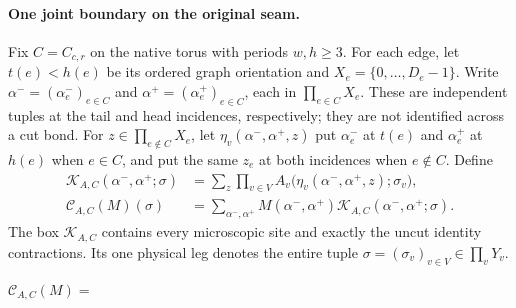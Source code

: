 \paragraph{One joint boundary on the original seam.}
Fix $C=C_{c,r}$ on the native torus with periods $w,h\geq3$.
For each edge, let $t(e)<h(e)$ be its ordered graph orientation and
$X_e=\{0,\ldots,D_e-1\}$. Write
$\alpha^-=(\alpha^-_e)_{e\in C}$ and
$\alpha^+=(\alpha^+_e)_{e\in C}$, each in $\prod_{e\in C}X_e$.
These are independent tuples at the tail and head incidences, respectively;
they are not identified across a cut bond.
For $z\in\prod_{e\notin C}X_e$, let
$\eta_v(\alpha^-,\alpha^+,z)$ put $\alpha^-_e$ at $t(e)$ and
$\alpha^+_e$ at $h(e)$ when $e\in C$, and put the same $z_e$ at
both incidences when $e\notin C$. Define
\begin{align}
    \mathcal K_{A,C}(\alpha^-,\alpha^+;\sigma)
     & =\sum_z\prod_{v\in V}
    A_v\bigl(\eta_v(\alpha^-,\alpha^+,z);\sigma_v\bigr), \\
    \mathcal C_{A,C}(M)(\sigma)
     & =\sum_{\alpha^-,\alpha^+}M(\alpha^-,\alpha^+)
    \mathcal K_{A,C}(\alpha^-,\alpha^+;\sigma).
    \label{eq:peps_dependent_seam_contraction}
\end{align}
The box $\mathcal K_{A,C}$ contains every microscopic site and exactly the
uncut identity contractions. Its one physical leg denotes the entire tuple
$\sigma=(\sigma_v)_{v\in V}\in\prod_vY_v$.
\begin{tenkzequation}
    \tenkzkernel
    $\mathcal C_{A,C}(M)=$
    \begin{tenkz}[rows={wire}, cols=2, bonds=none]
    \end{tenkz}
\end{tenkzequation}
